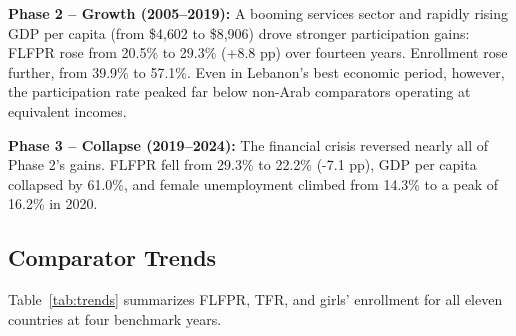 \documentclass[12pt,a4paper]{article}
\begin{document}
\textbf{Phase 2 -- Growth (2005--2019):} A booming services sector and rapidly rising GDP per capita (from \$4{,}602 to \$8{,}906) drove stronger participation gains: FLFPR rose from 20.5\% to 29.3\% (+8.8 pp) over fourteen years. Enrollment rose further, from 39.9\% to 57.1\%. Even in Lebanon's best economic period, however, the participation rate peaked far below non-Arab comparators operating at equivalent incomes.

\textbf{Phase 3 -- Collapse (2019--2024):} The financial crisis reversed nearly all of Phase 2's gains. FLFPR fell from 29.3\% to 22.2\% (-7.1 pp), GDP per capita collapsed by 61.0\%, and female unemployment climbed from 14.3\% to a peak of 16.2\% in 2020.

\subsection{Comparator Trends}

Table~\ref{tab:trends} summarizes FLFPR, TFR, and girls' enrollment for all eleven countries at four benchmark years.
\end{document}
